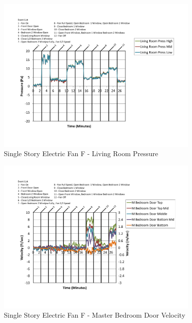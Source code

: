 \documentclass{article}
\begin{document}
\begin{appendices}
	\begin{figure}[H]
		\centering
		\includegraphics[height=3.05in,trim=0.67in 1.1in 0.67in 0.8in,clip=true]{0_Images/Results_Charts/ColdFlow/Single_Story/Electric/F/Living_Room_Pressure.pdf}
		\caption{Single Story Electric Fan F - Living Room Pressure}
	\end{figure}
 

	\begin{figure}[H]
		\centering
		\includegraphics[height=3.05in,trim=0.67in 1.1in 0.67in 0.8in,clip=true]{0_Images/Results_Charts/ColdFlow/Single_Story/Electric/F/Master_Bedroom_Door_Velocity.pdf}
		\caption{Single Story Electric Fan F - Master Bedroom Door Velocity}
	\end{figure}
 
	\clearpage


\end{appendices}
\end{document}
